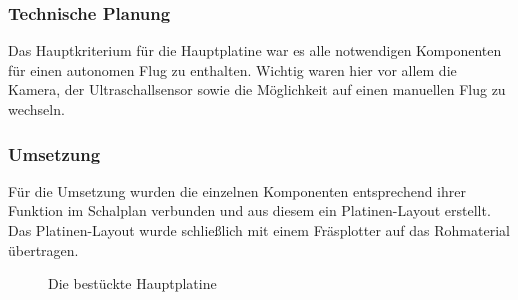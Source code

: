     \subsubsection{Technische Planung}
    Das Hauptkriterium für die Hauptplatine war es alle notwendigen Komponenten für einen autonomen Flug zu enthalten. Wichtig waren hier vor allem die Kamera,
    der Ultraschallsensor sowie die Möglichkeit auf einen manuellen Flug zu wechseln.

    \subsubsection{Umsetzung}
    Für die Umsetzung wurden die einzelnen Komponenten entsprechend ihrer Funktion im Schalplan verbunden und aus diesem ein Platinen-Layout erstellt.
    Das Platinen-Layout wurde schließlich mit einem Fräsplotter auf das Rohmaterial übertragen.

    \begin{figure}[tbh]
      \begin{centering}
      \par\end{centering}
      \caption{Die bestückte Hauptplatine}
      \label{Hauptplatine}
    \end{figure}

